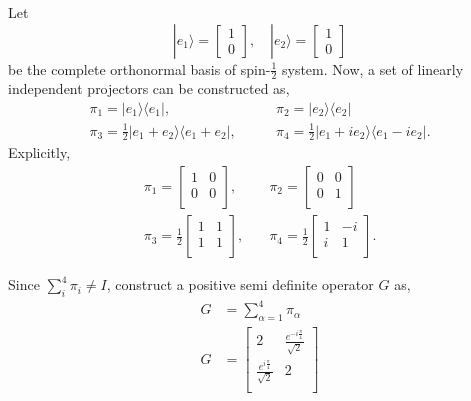 Let 
\begin{equation*}
|e_{1} \rangle = 
\begin{bmatrix}
1\\
0 
\end{bmatrix},\quad
|e_{2} \rangle = 
\begin{bmatrix}
1\\
0 
\end{bmatrix}
\end{equation*}
be the complete orthonormal basis of spin-$\frac{1}{2}$ system. Now, a set of linearly independent projectors can be constructed as,
\begin{align*}
\pi_{1} = |{e_{1}}\rangle \langle{e_{1}}|,\qquad & \pi_{2} = |{e_{2}}\rangle \langle{e_{2}}| \\
\pi_{3} = \frac{1}{2}|{e_{1}}+{e_{2}}\rangle \langle{e_{1}}+{e_{2}}|,\qquad & \pi_{4} = \frac{1}{2}|{e_{1}}+i{e_{2}}\rangle \langle{e_{1}}-i{e_{2}}|.
\end{align*}
Explicitly,
\begin{align*}
\pi_{1} =
\begin{bmatrix}
1 & 0  \\ 
0 & 0 \\ 
\end{bmatrix}
,\quad & \pi_{2}= 
\begin{bmatrix}
0 & 0\\ 
0 & 1\\ 
\end{bmatrix}\\
\pi_{3} = \frac{1}{2}
\begin{bmatrix}
1 & 1 \\ 
1 & 1\\ 
\end{bmatrix}
,\quad & \pi_{4} = \frac{1}{2}
\begin{bmatrix}
1 & -i \\ 
i & 1\\ 
\end{bmatrix}.
\end{align*}

Since $\sum_{i}^{4} \pi_{i} \neq I$, construct a positive semi definite operator $G$ as,  
\begin{align*}
G & = \sum_{\alpha=1}^{4} \pi_{\alpha}\\
G & = 
\begin{bmatrix}
2 & \frac{e^{-i\frac{\pi}{4}}}{\sqrt{2}}\\ 
\frac{e^{i\frac{\pi}{4}}}{\sqrt{2}} & 2\\ 
\end{bmatrix}
\end{align*}

